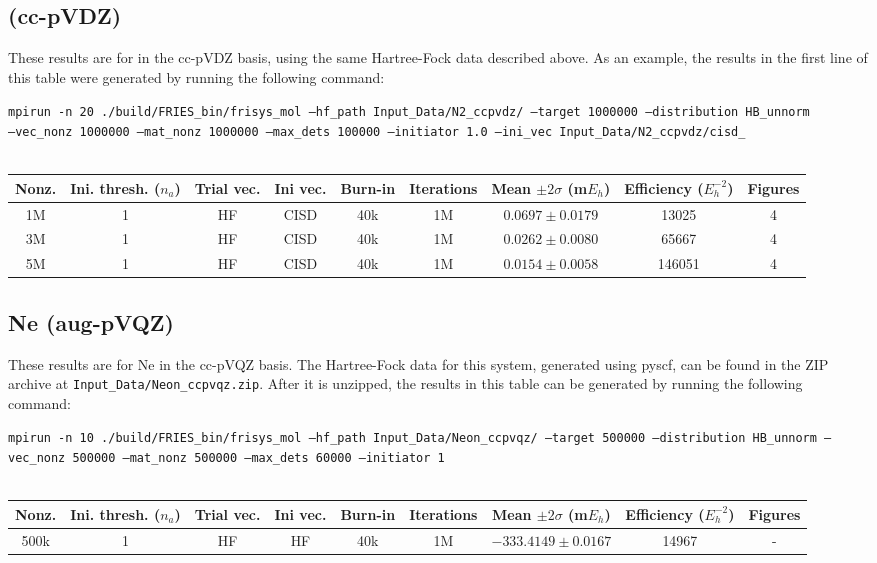 \documentclass[12pt, landscape]{article}
\begin{document}
\subsection*{ (cc-pVDZ)}
These results are for  in the cc-pVDZ basis, using the same Hartree-Fock data described above. As an example, the results in the first line of this table were generated by running the following command:

\texttt{mpirun -n 20 ./build/FRIES\_bin/frisys\_mol --hf\_path Input\_Data/N2\_ccpvdz/ --target 1000000 --distribution HB\_unnorm}\\ \texttt{--vec\_nonz 1000000 --mat\_nonz 1000000 --max\_dets 100000 --initiator 1.0 --ini\_vec Input\_Data/N2\_ccpvdz/cisd\_}
\\~\\
\begin{tabular}{c|c|c|c|c|c|c|c|c}
Nonz. & Ini. thresh. ($n_a$) & Trial vec. & Ini vec. & Burn-in & Iterations & Mean $\pm 2 \sigma$ (m$E_h$) & Efficiency ($E_h^{-2}$) & Figures \\ \hline
1M & 1 & HF & CISD & 40k & 1M & $0.0697 \pm 0.0179$ & 13025 & 4\\
3M & 1 & HF & CISD & 40k & 1M & $0.0262 \pm 0.0080$ & 65667 & 4\\
5M & 1 & HF & CISD & 40k & 1M & $0.0154 \pm 0.0058$ & 146051 & 4\\
\end{tabular}

\subsection*{Ne (aug-pVQZ)}
These results are for Ne in the cc-pVQZ basis. The Hartree-Fock data for this system, generated using pyscf, can be found in the ZIP archive at \texttt{Input\_Data/Neon\_ccpvqz.zip}. After it is unzipped, the results in this table can be generated by running the following command:

\texttt{mpirun -n 10 ./build/FRIES\_bin/frisys\_mol --hf\_path Input\_Data/Neon\_ccpvqz/ --target 500000 --distribution HB\_unnorm --vec\_nonz 500000 --mat\_nonz 500000 --max\_dets 60000 --initiator 1}
\\~\\
\begin{tabular}{c|c|c|c|c|c|c|c|c}
Nonz. & Ini. thresh. ($n_a$) & Trial vec. & Ini vec. & Burn-in & Iterations & Mean $\pm 2 \sigma$ (m$E_h$) & Efficiency ($E_h^{-2}$) & Figures \\ \hline
500k & 1 & HF & HF & 40k & 1M & $-333.4149 \pm 0.0167$ & 14967 & - \\
\end{tabular}
\end{document}

